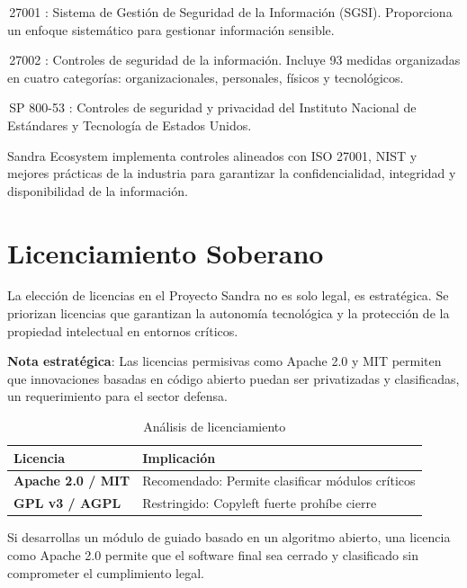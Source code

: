 \documentclass[11pt, spanish, letterpaper, twocolumn]{book}
\newcommand{\norma}[2]{%
    \tikz[baseline=(char.base)]{%
        \node[circle, fill=isoBlue, text=white, font=\bfseries\tiny, inner sep=1pt] (char) {#1};
    }\,#2%
}
\begin{document}
\norma{ISO}{27001}: Sistema de Gestión de Seguridad de la Información (SGSI). Proporciona un enfoque sistemático para gestionar información sensible.

\norma{ISO}{27002}: Controles de seguridad de la información. Incluye 93 medidas organizadas en cuatro categorías: organizacionales, personales, físicos y tecnológicos.

\norma{NIST}{SP 800-53}: Controles de seguridad y privacidad del Instituto Nacional de Estándares y Tecnología de Estados Unidos.

\begin{cajaestandar}
    Sandra Ecosystem implementa controles alineados con ISO 27001, NIST y mejores prácticas de la industria para garantizar la confidencialidad, integridad y disponibilidad de la información.
\end{cajaestandar}

\section{Licenciamiento Soberano}

La elección de licencias en el Proyecto Sandra no es solo legal, es estratégica. Se priorizan licencias que garantizan la autonomía tecnológica y la protección de la propiedad intelectual en entornos críticos.

\begin{cajaadvertencia}
    \textbf{Nota estratégica}: Las licencias permisivas como Apache 2.0 y MIT permiten que innovaciones basadas en código abierto puedan ser privatizadas y clasificadas, un requerimiento para el sector defensa.
\end{cajaadvertencia}

\begin{table}[H]
    \centering
    \caption{Análisis de licenciamiento}
    \begin{tabular}{lp{5.5cm}}
        \toprule
        \textbf{Licencia} & \textbf{Implicación} \\
        \midrule
        \textbf{Apache 2.0 / MIT} & Recomendado: Permite clasificar módulos críticos \\
        \textbf{GPL v3 / AGPL} & Restringido: Copyleft fuerte prohíbe cierre \\
        \bottomrule
    \end{tabular}
    \label{tab:licencias}
\end{table}

\begin{notacientifica}
    Si desarrollas un módulo de guiado basado en un algoritmo abierto, una licencia como Apache 2.0 permite que el software final sea cerrado y clasificado sin comprometer el cumplimiento legal.
\end{notacientifica}
\end{document}
